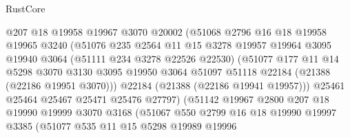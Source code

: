 \begin{lexlean}{RustCore}
\begin{coremodule}
                          @207
                          @18
                          @19958
                          @19967
                          @3070
                          @20002
                          (@51068
                            @2796
                            @16
                            @18
                            @19958
                            @19965
                            @3240
                            (@51076
                              @235
                              @2564
                              @11
                              @15
                              @3278
                              @19957
                              @19964
                              @3095
                              @19940
                              @3064
                              (@51111 @234 @3278 @22526 @22530)
                              (@51077
                                @177
                                @11
                                @14
                                @5298
                                @3070
                                @3130
                                @3095
                                @19950
                                @3064
                                @51097
                                @51118
                                @22184
                                (@21388 (@22186 @19951 @3070)))
                              @22184
                              (@21388 (@22186 @19941 @19957)))
                            @25461
                            @25464
                            @25467
                            @25471
                            @25476
                            @27797)
                          (@51142
                            @19967
                            @2800
                            @207
                            @18
                            @19990
                            @19999
                            @3070
                            @3168
                            (@51067
                              @550
                              @2799
                              @16
                              @18
                              @19990
                              @19997
                              @3385
                              (@51077
                                @535
                                @11
                                @15
                                @5298
                                @19989
                                @19996

\end{coremodule}
\end{lexlean}

